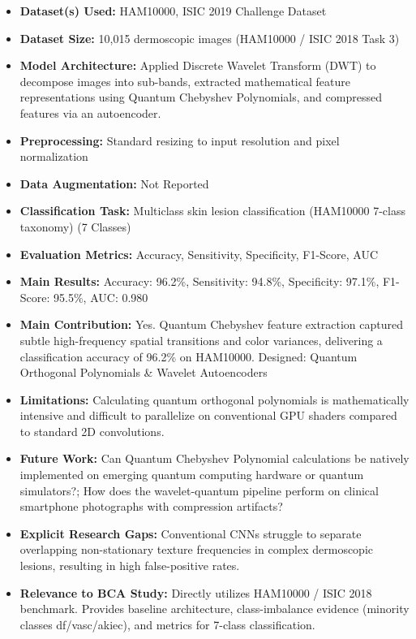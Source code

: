 \documentclass[11pt,a4paper]{article}
\begin{document}
\begin{itemize}\small
\item \textbf{Dataset(s) Used:} HAM10000, ISIC 2019 Challenge Dataset
\item \textbf{Dataset Size:} 10,015 dermoscopic images (HAM10000 / ISIC 2018 Task 3)
\item \textbf{Model Architecture:} Applied Discrete Wavelet Transform (DWT) to decompose images into sub-bands, extracted mathematical feature representations using Quantum Chebyshev Polynomials, and compressed features via an autoencoder.
\item \textbf{Preprocessing:} Standard resizing to input resolution and pixel normalization
\item \textbf{Data Augmentation:} Not Reported
\item \textbf{Classification Task:} Multiclass skin lesion classification (HAM10000 7-class taxonomy) (7 Classes)
\item \textbf{Evaluation Metrics:} Accuracy, Sensitivity, Specificity, F1-Score, AUC
\item \textbf{Main Results:} Accuracy: 96.2\%, Sensitivity: 94.8\%, Specificity: 97.1\%, F1-Score: 95.5\%, AUC: 0.980
\item \textbf{Main Contribution:} Yes. Quantum Chebyshev feature extraction captured subtle high-frequency spatial transitions and color variances, delivering a classification accuracy of 96.2\% on HAM10000. Designed: Quantum Orthogonal Polynomials \& Wavelet Autoencoders
\item \textbf{Limitations:} Calculating quantum orthogonal polynomials is mathematically intensive and difficult to parallelize on conventional GPU shaders compared to standard 2D convolutions.
\item \textbf{Future Work:} Can Quantum Chebyshev Polynomial calculations be natively implemented on emerging quantum computing hardware or quantum simulators?; How does the wavelet-quantum pipeline perform on clinical smartphone photographs with compression artifacts?
\item \textbf{Explicit Research Gaps:} Conventional CNNs struggle to separate overlapping non-stationary texture frequencies in complex dermoscopic lesions, resulting in high false-positive rates.
\item \textbf{Relevance to BCA Study:} Directly utilizes HAM10000 / ISIC 2018 benchmark. Provides baseline architecture, class-imbalance evidence (minority classes df/vasc/akiec), and metrics for 7-class classification.
\end{itemize}
\end{document}
